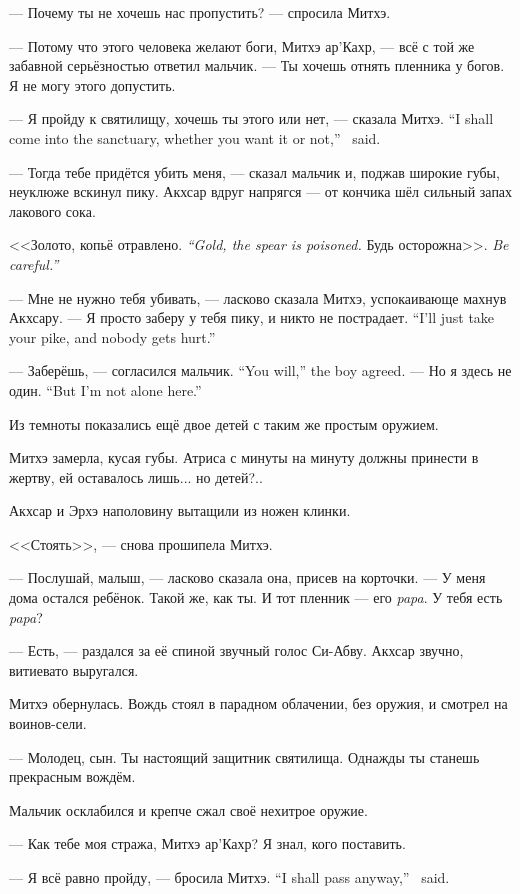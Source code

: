 --- Почему ты не хочешь нас пропустить? --- спросила Митхэ.

--- Потому что этого человека желают боги, Митхэ ар’Кахр, --- всё с той же забавной серьёзностью ответил мальчик.
--- Ты хочешь отнять пленника у богов.
Я не могу этого допустить.

{--- Я пройду к святилищу, хочешь ты этого или нет, --- сказала Митхэ.}
{``I shall come into the sanctuary, whether you want it or not,'' \Mitchoe\ said.}

--- Тогда тебе придётся убить меня, --- сказал мальчик и, поджав широкие губы, неуклюже вскинул пику.
Акхсар вдруг напрягся --- от кончика шёл сильный запах лакового сока.

{<<Золото, копьё отравлено.}
{\emph{``Gold, the spear is poisoned.}}
{Будь осторожна>>.}
{\emph{Be careful.''}}

--- Мне не нужно тебя убивать, --- ласково сказала Митхэ, успокаивающе махнув Акхсару.
{--- Я просто заберу у тебя пику, и никто не пострадает.}
{``I'll just take your pike, and nobody gets hurt.''}

{--- Заберёшь, --- согласился мальчик.}
{``You will,'' the boy agreed.}
{--- Но я здесь не один.}
{``But I'm not alone here.''}

Из темноты показались ещё двое детей с таким же простым оружием.

Митхэ замерла, кусая губы. Атриса с минуты на минуту должны принести в жертву, ей оставалось лишь... но детей?..

Акхсар и Эрхэ наполовину вытащили из ножен клинки.

<<Стоять>>, --- снова прошипела Митхэ.

--- Послушай, малыш, --- ласково сказала она, присев на корточки.
--- У меня дома остался ребёнок.
Такой же, как ты. И тот пленник --- его \textit{papa}. У тебя есть \textit{papa}?

--- Есть, --- раздался за её спиной звучный голос Си-Абву.
Акхсар звучно, витиевато выругался.

Митхэ обернулась.
Вождь стоял в парадном облачении, без оружия, и смотрел на воинов-сели.

--- Молодец, сын.
Ты настоящий защитник святилища.
Однажды ты станешь прекрасным вождём.

Мальчик осклабился и крепче сжал своё нехитрое оружие.

--- Как тебе моя стража, Митхэ ар’Кахр?
Я знал, кого поставить.

{--- Я всё равно пройду, --- бросила Митхэ.}
{``I shall pass anyway,'' \Mitchoe\ said.}

